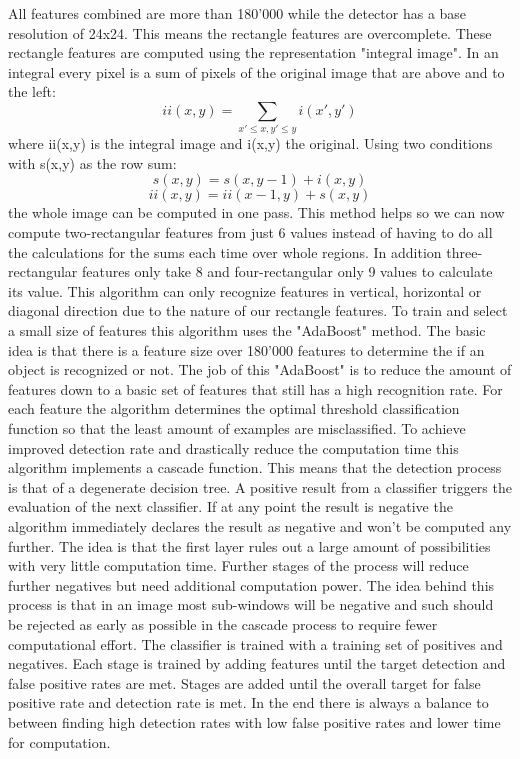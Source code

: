 All features combined are more than 180'000 while the detector has a base resolution of 24x24. This means the rectangle features are overcomplete.
These rectangle features are computed using the representation "integral image". In an integral every pixel is a sum of pixels of the original image that are above and to the left:
\[ii(x,y) = \sum_{x'\leq x, y'\leq y} i(x',y')\]
where ii(x,y) is the integral image and i(x,y) the original. Using two conditions with s(x,y) as the row sum:
\[s(x,y) = s(x,y-1)+i(x,y)\]
\[ii(x,y) = ii(x-1,y)+s(x,y)\]
the whole image can be computed in one pass.
This method helps so we can now compute two-rectangular features from just 6 values instead of having to do all the calculations for the sums each time over whole regions. In addition three-rectangular features only take 8 and four-rectangular only 9 values to calculate its value. This algorithm can only recognize features in vertical, horizontal or diagonal direction due to the nature of our rectangle features.
To train and select a small size of features this algorithm uses the "AdaBoost" method. The basic idea is that there is a feature size over 180'000 features to determine the if an object is recognized or not. The job of this "AdaBoost" is to reduce the amount of features down to a basic set of features that still has a high recognition rate. For each feature the algorithm determines the optimal threshold classification function so that the least amount of examples are misclassified.
To achieve improved detection rate and drastically reduce the computation time this algorithm implements a cascade function. This means that the detection process is that of a degenerate decision tree. A positive result from a classifier triggers the evaluation of the next classifier. If at any point the result is negative the algorithm immediately declares the result as negative and won't be computed any further. The idea is that the first layer rules out a large amount of possibilities with very little computation time. Further stages of the process will reduce further negatives but need additional computation power. The idea behind this process is that in an image most sub-windows will be negative and such should be rejected as early as possible in the cascade process to require fewer computational effort.
The classifier is trained with a training set of positives and negatives. Each stage is trained by adding features until the target detection and false positive rates are met. Stages are added until the overall target for false positive rate and detection rate is met. In the end there is always a balance to between finding high detection rates with low false positive rates and lower time for computation.

